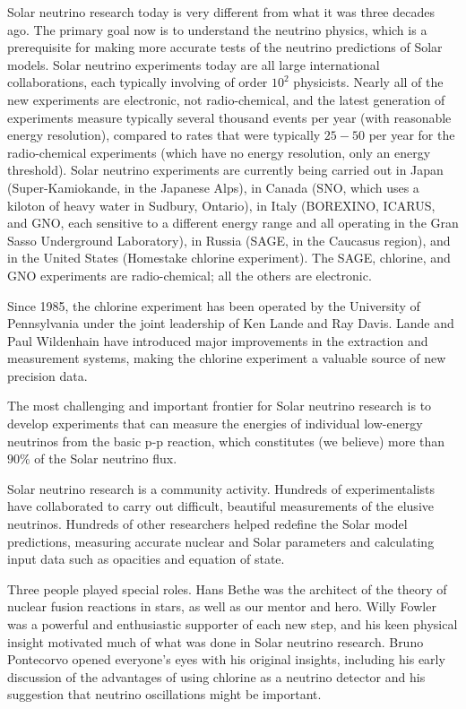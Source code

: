 \documentclass[a4paper,10pt]{article}
\begin{document}
{\noindent}Solar neutrino research today is very different from what it was three decades ago. The primary goal now is to understand the neutrino physics, which is a prerequisite for making more accurate tests of the neutrino predictions of Solar models. Solar neutrino experiments today are all large international collaborations, each typically involving of order $10^2$ physicists. Nearly all of the new experiments are electronic, not radio-chemical, and the latest generation of experiments measure typically several thousand events per year (with reasonable energy resolution), compared to rates that were typically $25-50$ per year for the radio-chemical experiments (which have no energy resolution, only an energy threshold). Solar neutrino experiments are currently being carried out in Japan (Super-Kamiokande, in the Japanese Alps), in Canada (SNO, which uses a kiloton of heavy water in Sudbury, Ontario), in Italy (BOREXINO, ICARUS, and GNO, each sensitive to a different energy range and all operating in the Gran Sasso Underground Laboratory), in Russia (SAGE, in the Caucasus region), and in the United States (Homestake chlorine experiment). The SAGE, chlorine, and GNO experiments are radio-chemical; all the others are electronic.

{\noindent}Since 1985, the chlorine experiment has been operated by the University of Pennsylvania under the joint leadership of Ken Lande and Ray Davis. Lande and Paul Wildenhain have introduced major improvements in the extraction and measurement systems, making the chlorine experiment a valuable source of new precision data. 

{\noindent}The most challenging and important frontier for Solar neutrino research is to develop experiments that can measure the energies of individual low-energy neutrinos from the basic p-p reaction, which constitutes (we believe) more than $90\%$ of the Solar neutrino flux. 

{\noindent}Solar neutrino research is a community activity. Hundreds of experimentalists have collaborated to carry out difficult, beautiful measurements of the elusive neutrinos. Hundreds of other researchers helped redefine the Solar model predictions, measuring accurate nuclear and Solar parameters and calculating input data such as opacities and equation of state.

{\noindent}Three people played special roles. Hans Bethe was the architect of the theory of nuclear fusion reactions in stars, as well as our mentor and hero. Willy Fowler was a powerful and enthusiastic supporter of each new step, and his keen physical insight motivated much of what was done in Solar neutrino research. Bruno Pontecorvo opened everyone's eyes with his original insights, including his early discussion of the advantages of using chlorine as a neutrino detector and his suggestion that neutrino oscillations might be important.
\end{document}
